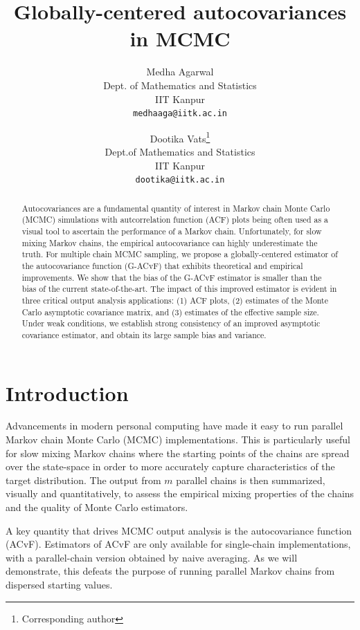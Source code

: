 \documentclass[11pt]{article}
\title{Globally-centered autocovariances in MCMC}
\author{
  Medha Agarwal \\
  Dept. of Mathematics and Statistics\\
  IIT Kanpur\\
  \texttt{medhaaga@iitk.ac.in} \and
 Dootika Vats\footnote{Corresponding author}\\
  Dept.of Mathematics and Statistics\\
  IIT Kanpur\\
  \texttt{dootika@iitk.ac.in}
}
\theoremstyle{remark}
\begin{document}
\maketitle


\onehalfspacing
\begin{abstract}
Autocovariances are a fundamental quantity of interest in Markov chain Monte Carlo (MCMC) simulations with autcorrelation function (ACF) plots being often used as a visual tool to ascertain the performance of a Markov chain. Unfortunately, for slow mixing Markov chains, the empirical autocovariance can highly underestimate the truth. For multiple chain MCMC sampling,  we propose a globally-centered estimator of the autocovariance function (G-ACvF) that exhibits theoretical and empirical improvements. We show that the bias of the G-ACvF estimator is smaller than the bias of the current state-of-the-art.  The impact of this improved estimator is evident in three critical output analysis applications: (1) ACF plots, (2) estimates of the Monte Carlo asymptotic covariance matrix, and (3) estimates of the effective sample size. Under weak conditions, we establish strong consistency of an improved asymptotic covariance estimator, and obtain its large sample bias and variance.  
\end{abstract}


\section{Introduction} \label{sec:intro}

Advancements in modern personal computing have made it easy to run parallel Markov chain Monte Carlo (MCMC) implementations. This is particularly useful for slow mixing Markov chains where the starting points of the chains are spread over the state-space in order to more accurately capture characteristics of the target distribution. The output from $m$ parallel chains is then summarized, visually and quantitatively, to assess the empirical mixing properties of the chains and the quality of Monte Carlo estimators.

A key quantity that drives MCMC output analysis is the autocovariance function (ACvF).
 Estimators of ACvF are only available for single-chain implementations, with a parallel-chain version obtained by naive averaging. As we will demonstrate, this defeats the purpose of running parallel Markov chains from dispersed starting values.
 
\end{document}
